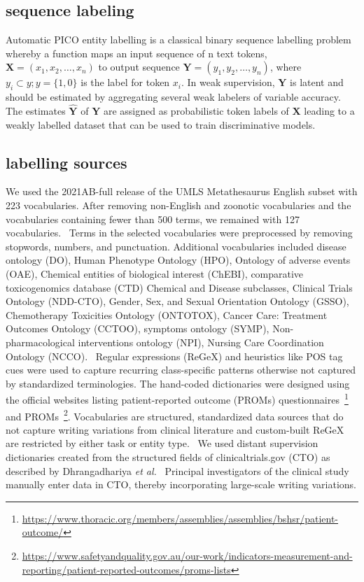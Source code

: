 \documentclass[10.7pt,]{article}
\begin{document}
\subsection{sequence labeling}\label{seq_lab}
%
Automatic PICO entity labelling is a classical binary sequence labelling problem whereby a function maps an input sequence of n text tokens, $ \bm{X} = (x_{1}, x_{2}, \dotso , x_{n} )$ to output sequence $\bm{Y} = (y_{1}, y_{2}, \dotso , y_{n} )$, where $y_{i} \subset y; y = \{1,0\} $ is the label for token $x_{i}$.
In weak supervision, $\bm{Y}$ is latent and should be estimated by aggregating several weak labelers of variable accuracy.
The estimates $\bm{\hat{Y}}$ of $\bm{Y}$ are assigned as probabilistic token labels of $\bm{X}$ leading to a weakly labelled dataset that can be used to train discriminative models.
%
\subsection{labelling sources}\label{lss}
%
We used the 2021AB-full release of the UMLS Metathesaurus English subset with 223 vocabularies.
After removing non-English and zoonotic vocabularies and the vocabularies containing fewer than 500 terms, we remained with 127 vocabularies.~\cite{humphreys1998unified}
Terms in the selected vocabularies were preprocessed by removing stopwords, numbers, and punctuation.
Additional vocabularies included disease ontology (DO), Human Phenotype Ontology (HPO), Ontology of adverse events (OAE), Chemical entities of biological interest (ChEBI),  comparative toxicogenomics database (CTD) Chemical and Disease subclasses, Clinical Trials Ontology (NDD-CTO), Gender, Sex, and Sexual Orientation Ontology (GSSO), Chemotherapy Toxicities Ontology (ONTOTOX), Cancer Care: Treatment Outcomes Ontology (CCTOO), symptoms ontology (SYMP), Non-pharmacological interventions ontology (NPI), Nursing Care Coordination Ontology (NCCO).~\cite{schriml2012disease,robinson2008human,he2014oae,de2010chemical,lin2020cto,kronk2020development,geifman2011towards,rogier2021using,lin2018cancer,mohammed2012building,ninot2018definition}
Regular expressions (ReGeX) and heuristics like POS tag cues were used to capture recurring class-specific patterns otherwise not captured by standardized terminologies.
The hand-coded dictionaries were designed using the official websites listing patient-reported outcome (PROMs) questionnaires~\footnote{\url{https://www.thoracic.org/members/assemblies/assemblies/bshsr/patient-outcome/}} and PROMs~\footnote{\url{https://www.safetyandquality.gov.au/our-work/indicators-measurement-and-reporting/patient-reported-outcomes/proms-lists}}.
Vocabularies are structured, standardized data sources that do not capture writing variations from clinical literature and custom-built ReGeX are restricted by either task or entity type.~\cite{ratner2017snorkel,safranchik2020weakly}
We used distant supervision dictionaries created from the structured fields of clinicaltrials.gov (CTO) as described by Dhrangadhariya \textit{et al.}~\cite{dhrangadhariya2022distant}
Principal investigators of the clinical study manually enter data in CTO, thereby incorporating large-scale writing variations.  
%
%
%
\end{document}
